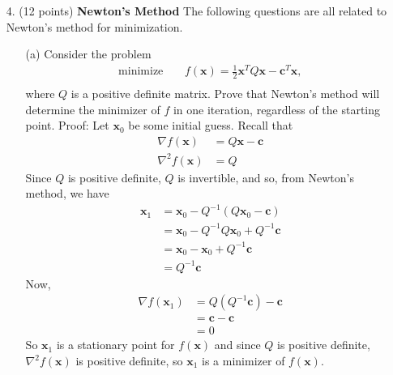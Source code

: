 \documentclass{article}
\begin{document}
\begin{itemize}
    \item[4.] (12 points) \textbf{Newton's Method}
    \newline\newline
    The following questions are all related to Newton's method for minimization.
    \begin{itemize}
        \item[(a)] Consider the problem 
        \begin{align*}
            \text{minimize} \:\:\:\:\: &f(\mathbf{x}) = \frac{1}{2}\mathbf{x}^TQ\mathbf{x} - \mathbf{c}^T\mathbf{x},\\
        \end{align*}
        where $Q$ is a positive definite matrix. Prove that Newton's method will determine the minimizer of $f$ in one iteration, regardless of the starting point.
        \newline\newline
        Proof: Let $\mathbf{x}_0$ be some initial guess. Recall that 
        \begin{align*}
            \nabla f(\mathbf{x}) &= Q\mathbf{x} - \mathbf{c}\\
            \nabla^2f(\mathbf{x}) &= Q
        \end{align*}
        Since $Q$ is positive definite, $Q$ is invertible, and so, from Newton's method, we have
        \begin{align*}
            \mathbf{x}_1 &= \mathbf{x}_0 - Q^{-1}(Q\mathbf{x}_0 - \mathbf{c}) \\
            &= \mathbf{x}_0 - Q^{-1}Q\mathbf{x}_0 + Q^{-1}\mathbf{c}\\
            &= \mathbf{x}_0 - \mathbf{x}_0 + Q^{-1}\mathbf{c}\\
            &= Q^{-1}\mathbf{c}
        \end{align*}
        Now, 
        \begin{align*}
            \nabla f(\mathbf{x}_1) &= Q(Q^{-1}\mathbf{c}) - \mathbf{c}\\
            &= \mathbf{c} - \mathbf{c}\\
            &= 0
        \end{align*}
        So $\mathbf{x}_1$ is a stationary point for $f(\mathbf{x})$ and since $Q$ is positive definite, $\nabla^2f(\mathbf{x})$ is positive definite, so $\mathbf{x}_1$ is a minimizer of $f(\mathbf{x})$.
        \newline\newline


\end{itemize}
\end{itemize}
\end{document}
